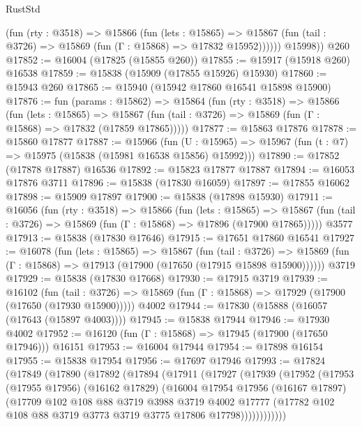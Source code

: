\begin{lexlean}{RustStd}
\begin{coremodule}
            (fun (rty : @3518) =>
            @15866
              (fun (lets : @15865) =>
              @15867 (fun (tail : @3726) => @15869 (fun (Γ : @15868) => @17832 @15952))))))
        @15998))
    @260
@17852 := @16004 (@17825 (@15855 @260))
@17855 := @15917 (@15918 @260) @16538
@17859 := @15838 (@15909 (@17855 @15926) @15930)
@17860 := @15943 @260
@17865 := @15940 (@15942 @17860 @16541 @15898 @15900)
@17876 := fun (params : @15862) =>
  @15864
    (fun (rty : @3518) =>
    @15866
      (fun (lets : @15865) =>
      @15867 (fun (tail : @3726) => @15869 (fun (Γ : @15868) => @17832 (@17859 @17865)))))
@17877 := @15863 @17876
@17878 := @15860 @17877
@17887 := @15966
    (fun (U : @15965) => @15967 (fun (t : @7) => @15975 (@15838 (@15981 @16538 @15856) @15992)))
@17890 := @17852 (@17878 @17887) @16536
@17892 := @15823 @17877 @17887
@17894 := @16053 @17876 @3711
@17896 := @15838 (@17830 @16059)
@17897 := @17855 @16062
@17898 := @15909 @17897
@17900 := @15838 (@17898 @15930)
@17911 := @16056
    (fun (rty : @3518) =>
    @15866
      (fun (lets : @15865) =>
      @15867 (fun (tail : @3726) => @15869 (fun (Γ : @15868) => @17896 (@17900 @17865)))))
    @3577
@17913 := @15838 (@17830 @17646)
@17915 := @17651 @17860 @16541
@17927 := @16078
    (fun (lets : @15865) =>
    @15867
      (fun (tail : @3726) =>
      @15869 (fun (Γ : @15868) => @17913 (@17900 (@17650 (@17915 @15898 @15900))))))
    @3719
@17929 := @15838 (@17830 @17668)
@17930 := @17915 @3719
@17939 := @16102
    (fun (tail : @3726) => @15869 (fun (Γ : @15868) => @17929 (@17900 (@17650 (@17930 @15900)))))
    @4002
@17944 := @17830 (@15888 (@16057 (@17643 (@15897 @4003))))
@17945 := @15838 @17944
@17946 := @17930 @4002
@17952 := @16120 (fun (Γ : @15868) => @17945 (@17900 (@17650 @17946))) @16151
@17953 := @16004 @17944
@17954 := @17898 @16154
@17955 := @15838 @17954
@17956 := @17697 @17946
@17993 := @17824
    (@17849
      (@17890
        (@17892
          (@17894
            (@17911
              (@17927
                (@17939
                  (@17952
                    (@17953
                      (@17955 @17956)
                      (@16162 @17829)
                      (@16004
                        @17954
                        @17956
                        (@16167 @17897)
                        (@17709
                          @102
                          @108
                          @88
                          @3719
                          @3988
                          @3719
                          @4002
                          @17777
                          (@17782 @102 @108 @88 @3719 @3773 @3719 @3775 @17806 @17798))))))))))))

\end{coremodule}
\end{lexlean}
